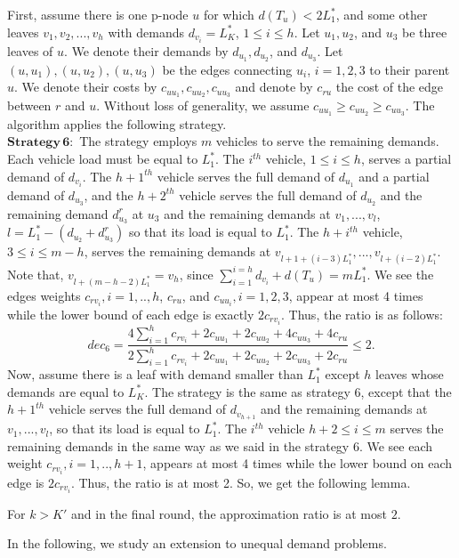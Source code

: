 \indent First, assume there is one p-node $u$ for which $d(T_u) <2L_1^*$, and some other leaves $v_1, v_2,...,v_h$ with demands $d_{v_i}=L_K^*$, $1 \le i \le h$. Let $u_1, u_2$, and $u_3$ be three leaves of $u$. We denote their demands by $d_{u_1}, d_{u_2}$, and $d_{u_3}$. Let $(u,u_1), (u,u_2), (u,u_3)$ be the edges connecting $u_i$, $i=1,2,3$ to their parent $u$. We denote their costs by $c_{uu_1}, c_{uu_2}, c_{uu_3}$ and denote by $c_{ru}$ the cost of the edge between $r$ and $u$. Without loss of generality, we assume $c_{uu_1} \ge c_{uu_2} \ge c_{uu_3}$. The algorithm applies the following strategy.\\

\indent $\mathbf{Strategy \, 6}:$ The strategy employs $m$ vehicles to serve the remaining demands. Each vehicle load must be equal to $L_1^*$. The $i^{th}$ vehicle, $1 \le i \le h$, serves a partial demand of $d_{v_i}$. The ${h+1}^{th}$ vehicle serves the full demand of $d_{u_1}$ and a partial demand of $d_{u_3}$, and the ${h+2}^{th}$ vehicle serves the full demand of $d_{u_2}$ and the remaining demand $d^r_{u_3}$ at $u_3$ and the remaining demands at $v_1, ... , v_l$, $l=L_1^*-(d_{u_2}+d^r_{u_3})$ so that its load is equal to $L_1^*$. The $h+i^{th}$ vehicle, $3 \le i \le m-h$, serves the remaining demands at $v_{l+1+(i-3)L_1^*} ,..., v_{l+(i-2)L_1^*}$. Note that, $v_{l+(m-h-2)L_1^*}=v_{h}$, since $\sum_{i=1}^{i=h} d_{v_i} +d(T_u)=m L_1^*$. We see the edges weights $c_{rv_i}, i=1,..,h$, $c_{ru}$, and $c_{uu_i}, i=1,2,3$, appear at most 4 times while the lower bound of each edge is exactly $2c_{rv_i}$. Thus, the ratio is as follows:
$$ dec_{6} = \frac{4 \sum_{i=1}^{h} {c_{rv_i}} + 2c_{uu_1}+ 2c_{uu_2} +4c_{uu_3}+4c_{ru}}{2\sum_{i=1}^{h} c_{rv_i}+2c_{uu_1}+ 2c_{uu_2} +2c_{uu_3}+2c_{ru}} \le 2.$$
\indent Now, assume there is a leaf with demand smaller than $L_1^*$ except $h$ leaves whose demands are equal to $L_K^*$. The strategy is the same as strategy 6, except that the ${h+1}^{th}$ vehicle serves the full demand of $d_{v_{h+1}}$ and the remaining demands at $v_1, ... , v_l$, so that its load is equal to $L_1^*$. The $i^{th}$ vehicle $h+2 \le i \le m$ serves the remaining demands in the same way as we said in the strategy 6. We see each weight $c_{rv_i}, i=1,..,h+1$, appears at most 4 times while the lower bound on each edge is $2c_{rv_i}$. Thus, the ratio is at most 2. So, we get the following lemma.
\begin{lemma}
For $k > K'$ and in the final round, the approximation ratio is at most $2$. 
\end{lemma}
\indent In the following, we study an extension to unequal demand problems.
